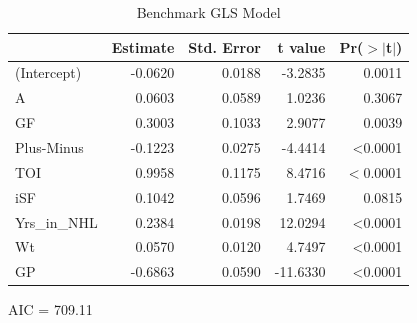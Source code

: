 \documentclass[10pt]{article}
\begin{document}
{{{{\begin{table}[tph]
\caption{\label{tab:benchmark-gls}Benchmark GLS Model}
\centering
\begin{threeparttable}
\begin{tabular}[t]{lrrrr}
  \toprule
     & Estimate & Std. Error & t value & Pr($>$$|$t$|$) \\ 
  \midrule
    (Intercept) & -0.0620 & 0.0188 & -3.2835 & 0.0011 \\
    A & 0.0603 & 0.0589 & 1.0236 & 0.3067 \\
    GF & 0.3003 & 0.1033 & 2.9077 & 0.0039 \\
    Plus-Minus & -0.1223 & 0.0275 & -4.4414 & <0.0001 \\
    TOI & 0.9958 & 0.1175 & 8.4716 & $<$0.0001 \\
    iSF & 0.1042 & 0.0596 & 1.7469 & 0.0815 \\
    Yrs\_in\_NHL & 0.2384 & 0.0198 & 12.0294 & <0.0001\\
    Wt & 0.0570 & 0.0120 & 4.7497 & <0.0001 \\
    GP & -0.6863 & 0.0590 & -11.6330 & <0.0001\\
   \bottomrule
\end{tabular}
    \begin{tablenotes}
      \item AIC = 709.11
    \end{tablenotes}
  \end{threeparttable}    
\end{table}

}}}}
\end{document}
